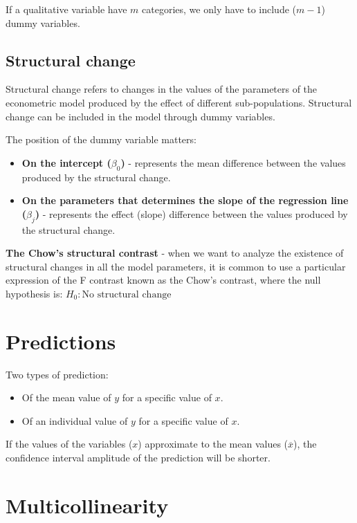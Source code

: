 \documentclass[10pt, a4paper, landscape]{extarticle}
\begin{document}
\begin{multicols}{3}
If a qualitative variable have $m$ categories, we only have to include ($m-1$) dummy variables.

\subsection*{Structural change}

Structural change refers to changes in the values of the parameters of the econometric model produced by the effect of different sub-populations. Structural change can be included in the model through dummy variables.

The position of the dummy variable matters:
\begin{itemize}[leftmargin=*]
\item \textbf{On the intercept ($\beta_0$)} - represents the mean difference between the values produced by the structural change.
\item \textbf{On the parameters that determines the slope of the regression line ($\beta_j$)} - represents the effect (slope) difference between the values produced by the structural change.
\end{itemize}

\textbf{The Chow's structural contrast} - when we want to analyze the existence of structural changes in all the model parameters, it is common to use a particular expression of the F contrast known as the Chow's contrast, where the null hypothesis is: $H_0: \text{No structural change}$

\section*{Predictions}

Two types of prediction:

\begin{itemize}[leftmargin=*]
\item Of the mean value of $y$ for a specific value of $x$.
\item Of an individual value of $y$ for a specific value of $x$.
\end{itemize}

If the values of the variables ($x$) approximate to the mean values ($\overline{x}$), the confidence interval amplitude of the prediction will be shorter. 

\columnbreak

\section*{Multicollinearity}


\end{multicols}
\end{document}
